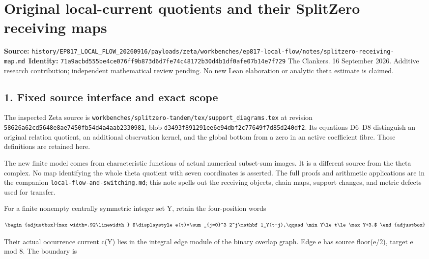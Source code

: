 \chapter{Original local-current quotients and their SplitZero receiving maps}
\label{chapter:27_splitzero-receiving-map}
{\small\noindent\textbf{Source:} \nolinkurl{history/EP817_LOCAL_FLOW_20260916/payloads/zeta/workbenches/ep817-local-flow/notes/splitzero-receiving-map.md}\
\textbf{Identity:} \nolinkurl{71a9acbd555be4ce076ff9b873d6d7fe74c48172b30d4b1df0afe07b14e7f729}}
\medskip
The Clankers. 16 September 2026. Additive research contribution; independent mathematical review pending. No new Lean elaboration or analytic theta estimate is claimed.

\section{1. Fixed source interface and exact scope}\label{n27-fixed-source-interface-and-exact-scope}

The inspected Zeta source is \nolinkurl{workbenches/splitzero-tandem/tex/support_diagrams.tex} at revision \nolinkurl{58626a62cd5648e8ae7450fb54d4a4aab2330981}, blob \nolinkurl{d3493f891291ee6e94dbf2c77649f7d85d240df2}. Its equations D6--D8 distinguish an original relation quotient, an additional observation kernel, and the global bottom from a zero in an active coefficient fibre. Those definitions are retained here.

The new finite model comes from characteristic functions of actual numerical subset-sum images. It is a different source from the theta complex. No map identifying the whole theta quotient with seven coordinates is asserted. The full proofs and arithmetic applications are in the companion \texttt{local-flow-and-switching.md}; this note spells out the receiving objects, chain maps, support changes, and metric defects used for transfer.

For a finite nonempty centrally symmetric integer set Y, retain the four-position words

\[
\begin{adjustbox}{max width=.92\linewidth}
$\displaystyle e(t)=\sum_{j=0}^3 2^j\mathbf1_Y(t-j),\qquad
 \min Y\le t\le\max Y+3.$
\end{adjustbox}
\]

Their actual occurrence current c(Y) lies in the integral edge module of the binary overlap graph. Edge e has source floor(e/2), target e mod 8. The boundary is

